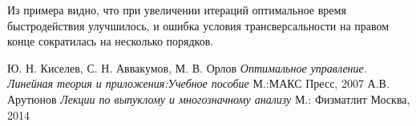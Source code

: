 \documentclass[10pt]{article}
\begin{document}
\begin{figure}[h]
    \centering
    \qquad
\end{figure}

Из примера видно, что при увеличении итераций оптимальное время быстродействия улучшилось, и ошибка условия трансверсальности на правом конце сократилась на несколько порядков.
\newpage

\begin{thebibliography}{0}
Ю. Н. Киселев, С. Н. Аввакумов, М. В. Орлов \emph{Оптимальное управление. Линейная теория и приложения:Учебное пособие} М.:МАКС Пресс, 2007
А.В. Арутюнов \emph{Лекции по выпуклому и многозначному анализу} М.: Физматлит Москва, 2014
\end{thebibliography}
\end{document}
